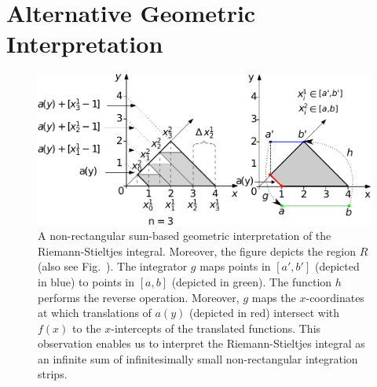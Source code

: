 \documentclass{article}
\theoremstyle{theorem}
\theoremstyle{definition}
\begin{document}
\section{Alternative Geometric Interpretation}
\begin{figure}[htb]
\centering
\includegraphics[width=1\textwidth]{fig13_change}
\caption{A non-rectangular sum-based geometric interpretation of the Riemann-Stieltjes integral. Moreover, the figure depicts the region $R$ (also see Fig.~). The integrator $g$ maps points 
in $[a',b']$ (depicted in blue) to points in $[a,b]$ (depicted in green). The function $h$ performs the reverse operation. Moreover, $g$ maps the $x$-coordinates at which
translations of $a(y)$ (depicted in red) intersect with $f(x)$ to the $x$-intercepts of the translated functions. This observation enables us to interpret the Riemann-Stieltjes integral as an infinite sum of infinitesimally small non-rectangular integration 
strips.}
\label{fig:2d_geo}
\end{figure}
\end{document}
